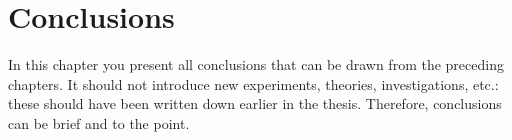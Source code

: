 \chapter{Conclusions}\label{conclusions}
In this chapter you present all conclusions that can be drawn from the
preceding chapters.
It should not introduce new experiments, theories, investigations, etc.:
these should have been written down earlier in the thesis.
Therefore, conclusions can be brief and to the point.
